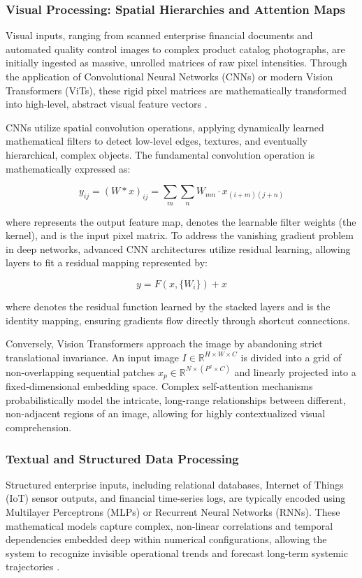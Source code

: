 \subsubsection{Visual Processing: Spatial Hierarchies and Attention Maps}
Visual inputs, ranging from scanned enterprise financial documents and automated quality control images to complex product catalog photographs, are initially ingested as massive, unrolled matrices of raw pixel intensities. Through the application of Convolutional Neural Networks (CNNs) or modern Vision Transformers (ViTs), these rigid pixel matrices are mathematically transformed into high-level, abstract visual feature vectors \parencite{khan2025adaptive}.

CNNs utilize spatial convolution operations, applying dynamically learned mathematical filters to detect low-level edges, textures, and eventually hierarchical, complex objects. The fundamental convolution operation is mathematically expressed as:

\begin{equation*}
    y_{ij} = (W * x)_{ij} = \sum_{m} \sum_{n} W_{mn} \cdot x_{(i+m)(j+n)}
\end{equation*}

where  represents the output feature map,  denotes the learnable filter weights (the kernel), and  is the input pixel matrix. To address the vanishing gradient problem in deep networks, advanced CNN architectures utilize residual learning, allowing layers to fit a residual mapping represented by:

\begin{equation*}
    y = F(x, \{W_i\}) + x
\end{equation*}

where  denotes the residual function learned by the stacked layers and  is the identity mapping, ensuring gradients flow directly through shortcut connections.

Conversely, Vision Transformers approach the image by abandoning strict translational invariance. An input image $I \in \mathbb{R}^{H \times W \times C}$ is divided into a grid of non-overlapping sequential patches $x_p \in \mathbb{R}^{N \times (P^2 \times C)}$ and linearly projected into a fixed-dimensional embedding space. Complex self-attention mechanisms probabilistically model the intricate, long-range relationships between different, non-adjacent regions of an image, allowing for highly contextualized visual comprehension.

\subsubsection{Textual and Structured Data Processing}
Structured enterprise inputs, including relational databases, Internet of Things (IoT) sensor outputs, and financial time-series logs, are typically encoded using Multilayer Perceptrons (MLPs) or Recurrent Neural Networks (RNNs). These mathematical models capture complex, non-linear correlations and temporal dependencies embedded deep within numerical configurations, allowing the system to recognize invisible operational trends and forecast long-term systemic trajectories \parencite{gumber2025multimodal}.


